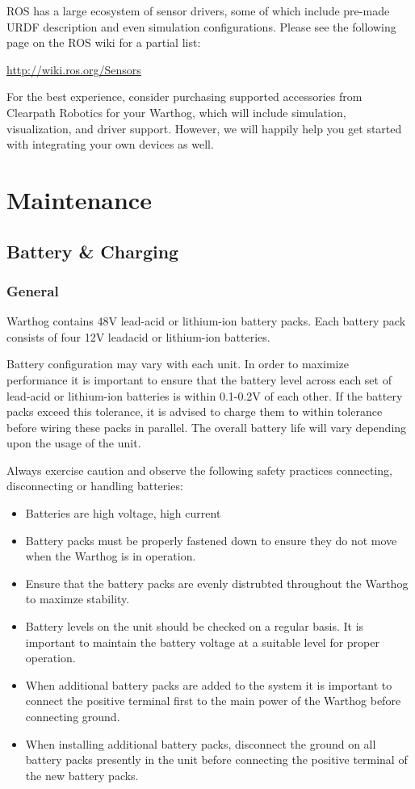 \documentclass[]{clearpath-latex/clearpath-manual}
\begin{document}
ROS has a large ecosystem of sensor drivers, some of which include pre-made URDF description and even simulation configurations.  Please see the following page on the ROS wiki for a partial list:

\url{http://wiki.ros.org/Sensors}

For the best experience, consider purchasing supported accessories from Clearpath Robotics for your Warthog, which will include simulation, visualization, and driver support.  However, we will happily help you get started with integrating your own devices as well.

\section{Maintenance}

\subsection{Battery \& Charging}

\subsubsection{General}

Warthog contains 48V lead-acid or lithium-ion battery packs. Each battery pack consists of four 12V leadacid or lithium-ion batteries.

Battery configuration may vary with each unit. In order to maximize performance it is important to ensure that the battery level across each set of lead-acid or lithium-ion batteries is within 0.1-0.2V of each other. If the battery packs exceed this tolerance, it is advised to charge them to within tolerance before wiring these packs
in parallel. The overall battery life will vary depending upon the usage of the unit.

Always exercise caution and observe the following safety practices connecting, disconnecting or handling batteries:

\begin{itemize}[nolistsep]
  \item Batteries are high voltage, high current
  \item Battery packs must be properly fastened down to ensure they do not move when the Warthog is in operation.
  \item Ensure that the battery packs are evenly distrubted throughout the Warthog to maximze stability.
  \item Battery levels on the unit should be checked on a regular basis.  It is important to maintain the battery voltage at a suitable level for proper operation.
  \item When additional battery packs are added to the system it is important to connect the positive terminal first to the main power of the Warthog before connecting ground.
  \item When installing additional battery packs, disconnect the ground on all battery packs presently in the unit before connecting the positive terminal of the new battery packs.
\end{itemize}
\end{document}
